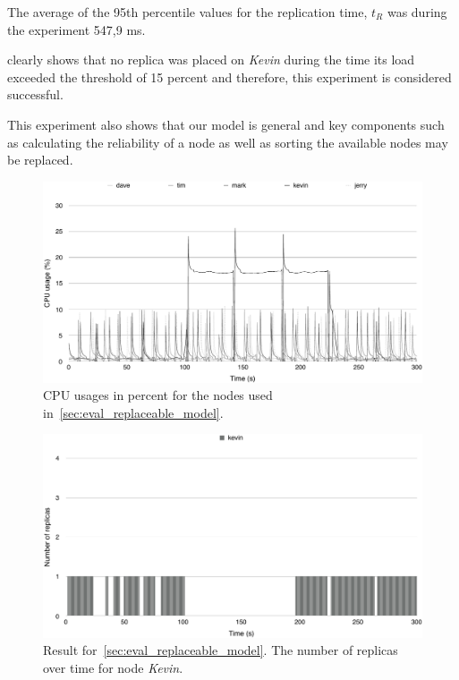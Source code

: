 \documentclass{cslthse-msc}
\begin{document}
The average of the 95th percentile values for the replication time, $t_R$ was during the experiment 547,9 ms.

 clearly shows that no replica was placed on \emph{Kevin} during the time its load exceeded the threshold of 15 percent and therefore, this experiment is considered successful. 

This experiment also shows that our model is general and key components such as calculating the reliability of a node as well as sorting the available nodes may be replaced.

\begin{figure}[!hbt]
\centering
\includegraphics[scale=0.5]{images/results/loads/usages.pdf}
\caption[CPU usage for nodes in~\cref{sec:eval_replaceable_model}]{CPU usages in percent for the nodes used in~\cref{sec:eval_replaceable_model}.} \label{fig:eval_replaceable_model_usages}
\end{figure}

\begin{figure}[!hbt]
\centering
\includegraphics[scale=0.5]{images/results/loads/loaded.pdf}
\caption[Number of replicas on node \emph{Kevin} in~\cref{sec:eval_replaceable_model}]{Result for~\cref{sec:eval_replaceable_model}. The number of replicas over time for node \emph{Kevin}.} \label{fig:eval_replaceable_model_loaded}
\end{figure}
\end{document}
